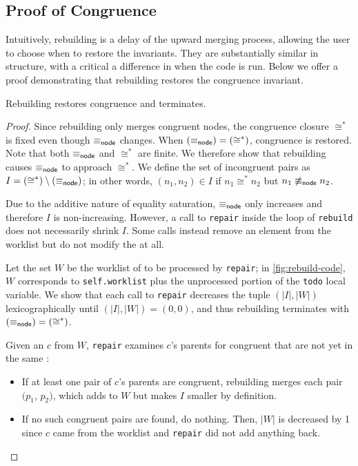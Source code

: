 \subsection{Proof of Congruence}

Intuitively, rebuilding is a delay of the upward merging process, allowing
  the user to choose when to restore the \egraph invariants.
They are substantially similar in structure, with a critical a difference in when
  the code is run.
Below we offer a proof demonstrating that rebuilding restores the
\egraph congruence invariant.

\begin{theorem}
  Rebuilding restores congruence and terminates.
\end{theorem}

\begin{proof}
  Since rebuilding only merges congruent nodes,
    the congruence closure $\cong^{*}$ is fixed even though $\equiv_{\sf node}$ changes.
  When $(\equiv_{\sf node}) = (\cong^*)$, congruence is restored.
  Note that both $\equiv_{\sf node}$ and $\cong^*$ are finite.
  We therefore show that rebuilding causes $\equiv_{\sf node}$ to approach $\cong^*$.
  We define the set of incongruent \enode pairs as $I = (\cong^*) \setminus (\equiv_{\sf node})$;
  in other words,
    $(n_{1}, n_{2}) \in I$ if $n_{1} \cong^{*} n_{2}$
     but $n_{1} \not\equiv_{\sf node} n_{2}$.

  Due to the additive nature of equality saturation, $\equiv_{\sf node}$ only increases
    and therefore $I$ is non-increasing.
  However, a call to \texttt{repair} inside the loop of \texttt{rebuild} does
    not necessarily shrink $I$.
  Some calls instead remove an element from the worklist but do not modify the
    \egraph at all.

  Let the set $W$ be the worklist of \eclasses to be processed by
    \texttt{repair};
  in \autoref{fig:rebuild-code}, $W$ corresponds to \texttt{self.worklist} plus
    the unprocessed portion of the \texttt{todo} local variable.
  We show that each call to \texttt{repair} decreases the tuple
    $(|I|, |W|)$ lexicographically until $(|I|, |W|) = (0, 0)$,
    and thus rebuilding terminates with $(\equiv_{\sf node}) = (\cong^*)$.


  Given an \eclass $c$ from $W$, \texttt{repair} examines $c$'s parents
    for congruent \enodes that are not yet in the same \eclass:
  \begin{itemize}
    \item If at least one pair of $c$'s parents are congruent,
          rebuilding merges each pair $(p_{1}$, $p_{2})$,
          which adds to $W$ but makes $I$ smaller by definition.
    \item If no such congruent pairs are found, do nothing.
          Then, $|W|$ is decreased by 1 since $c$ came from the
          worklist and \texttt{repair} did not add anything back.
  \end{itemize}


\end{proof}
